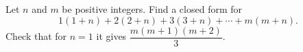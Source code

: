 Let $n$ and $m$ be positive integers. Find a closed form for
\[
1(1+n)+2(2+n)+3(3+n)+\cdots+m(m+n).
\]
Check that for $n=1$ it gives $\dfrac{m(m+1)(m+2)}{3}$.
